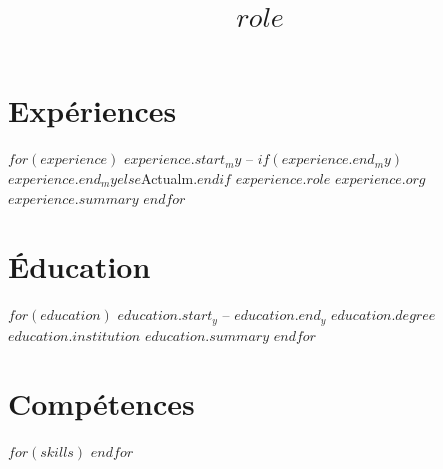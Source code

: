 \documentclass[11pt,a4paper,sans]{moderncv}
\title{$role$}
\begin{document}
\makecvtitle

\section{Expériences}
$for(experience)$
\cventry
  {$experience.start_my$ -- $if(experience.end_my)$$experience.end_my$$else$Actualm.$endif$}
  {$experience.role$}
  {$experience.org$}
  {}
  {}
  {$experience.summary$}
$endfor$

\newpage
\section{Éducation}
$for(education)$
\cventry
  {$education.start_y$ -- $education.end_y$}
  {$education.degree$}
  {$education.institution$}
  {}
  {}
  {$education.summary$}
$endfor$

\section{Compétences}
$for(skills)$
$endfor$
\end{document}
